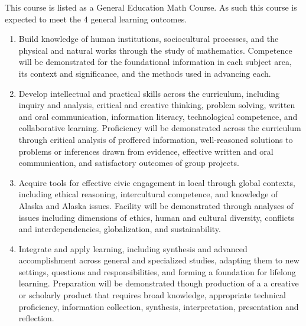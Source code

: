 \documentclass[12pt]{article}
\begin{document}
\pagebreak

 This course is listed as a General Education Math Course. As such this course is expected to meet the 4 general learning outcomes. 

\begin{enumerate}
\item Build knowledge of human institutions, sociocultural processes, and the physical and natural works through the study of mathematics.  Competence will be demonstrated for the foundational information in each subject area, its context and significance, and the methods used in advancing each.

\item Develop intellectual and practical skills across the curriculum, including inquiry and analysis, critical and creative thinking, problem solving, written and oral communication, information literacy, technological competence, and collaborative learning. Proficiency will be demonstrated across the curriculum through critical analysis of proffered information, well-reasoned solutions to problems or inferences drawn from evidence, effective written and oral communication, and satisfactory outcomes of group projects.

\item Acquire tools for effective civic engagement in local through global contexts, including ethical reasoning, intercultural competence, and knowledge of Alaska and Alaska issues.  Facility will be demonstrated through analyses of issues including dimensions of ethics, human and cultural diversity, conflicts and interdependencies, globalization, and sustainability.   

\item Integrate and apply learning, including synthesis and advanced accomplishment across general and specialized studies, adapting them to new settings, questions and responsibilities, and forming a foundation for lifelong learning. Preparation will be demonstrated though production of a a creative or scholarly product that requires broad knowledge, appropriate technical proficiency, information collection, synthesis, interpretation, presentation and reflection.
\end{enumerate}
\end{document}
